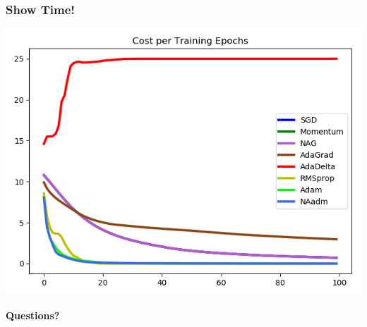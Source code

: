 \documentclass{beamer}
\begin{document}
\begin{fram}
    \frametitle{Show Time!}
    
    \includegraphics[scale=0.5]{presentation/MathOpt-proj/myplot.png}
\end{fram}

\begin{frame}
    \center \textbf{Questions?}
\end{frame}
\end{document}

